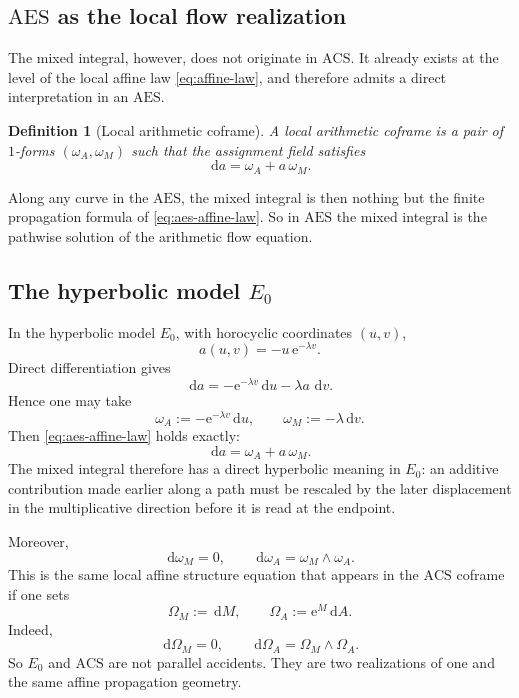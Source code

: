 \documentclass[11pt]{article}
\newtheorem{definition}{Definition}
\newcommand{\dd}{\,\mathrm{d}}
\newcommand{\ee}{\mathrm{e}}
\newcommand{\ACS}{\mathrm{ACS}}
\newcommand{\AES}{\mathrm{AES}}
\begin{document}
\subsection{$\AES$ as the local flow realization}

The mixed integral, however, does not originate in $\ACS$. It already exists at the level of the local affine law \eqref{eq:affine-law}, and therefore admits a direct interpretation in an $\AES$.

\begin{definition}[Local arithmetic coframe]
A local arithmetic coframe is a pair of $1$-forms $(\omega_A,\omega_M)$ such that the assignment field satisfies
\begin{equation}
\label{eq:aes-affine-law}
\dd a=\omega_A+a\,\omega_M.
\end{equation}
\end{definition}

Along any curve in the $\AES$, the mixed integral is then nothing but the finite propagation formula of \eqref{eq:aes-affine-law}. So in $\AES$ the mixed integral is the pathwise solution of the arithmetic flow equation.

\subsection{The hyperbolic model $E_0$}

In the hyperbolic model $E_0$, with horocyclic coordinates $(u,v)$,
\[
a(u,v)=-u\,\ee^{-\lambda v}.
\]
Direct differentiation gives
\begin{equation}
\label{eq:e0-coframe}
\dd a=-\ee^{-\lambda v}\dd u-\lambda a\,\dd v.
\end{equation}
Hence one may take
\begin{equation}
\label{eq:e0-omega}
\omega_A:=-\ee^{-\lambda v}\dd u,
\qquad
\omega_M:=-\lambda\dd v.
\end{equation}
Then \eqref{eq:aes-affine-law} holds exactly:
\[
\dd a=\omega_A+a\,\omega_M.
\]
The mixed integral therefore has a direct hyperbolic meaning in $E_0$: an additive contribution made earlier along a path must be rescaled by the later displacement in the multiplicative direction before it is read at the endpoint.

Moreover,
\begin{equation}
\label{eq:MC-e0}
\dd\omega_M=0,
\qquad
\dd\omega_A=\omega_M\wedge\omega_A.
\end{equation}
This is the same local affine structure equation that appears in the $\ACS$ coframe if one sets
\[
\Omega_M:=\dd M,
\qquad
\Omega_A:=\ee^M\dd A.
\]
Indeed,
\[
\dd\Omega_M=0,
\qquad
\dd\Omega_A=\Omega_M\wedge\Omega_A.
\]
So $E_0$ and $\ACS$ are not parallel accidents. They are two realizations of one and the same affine propagation geometry.
\end{document}
